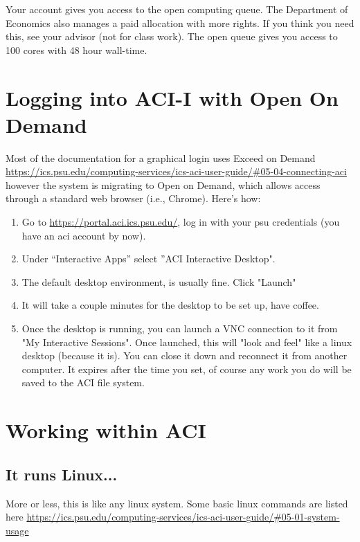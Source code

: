 \documentclass[twoside]{article}
\begin{document}
Your account gives you access to the open computing queue. The Department of Economics also manages a paid allocation with more rights.  If you think you need this, see your advisor (not for class work). The open queue gives you access to 100 cores with 48 hour wall-time. 
 
\section{Logging into ACI-I with Open On Demand} 

Most of the documentation for a graphical login uses Exceed on Demand \url{https://ics.psu.edu/computing-services/ics-aci-user-guide/#05-04-connecting-aci} however the system is migrating to Open on Demand, which allows access through a standard web browser (i.e., Chrome). Here's how: 

\begin{enumerate}
\item Go to \url{https://portal.aci.ics.psu.edu/}, log in with your psu credentials (you have an aci account by now). 
\item Under ``Interactive Apps'' select ''ACI Interactive Desktop". 
\item The default desktop environment, is usually fine. Click "Launch"
\item It will take a couple minutes for the desktop to be set up, have coffee. 
\item Once the desktop is running, you can launch a VNC connection to it from "My Interactive Sessions". Once launched, this will "look and feel" like a linux desktop (because it is). You can close it down and reconnect it from another computer. It expires after the time you set, of course any work you do will be saved to the ACI file system. 
\end{enumerate} 
 
 \section{Working within ACI} 

\subsection{It runs Linux...}

More or less, this is like any linux system. Some basic linux commands are listed here \url{https://ics.psu.edu/computing-services/ics-aci-user-guide/#05-01-system-usage}
\end{document}
